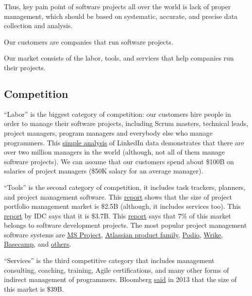 \documentclass[12pt]{article}
\begin{document}
Thus, key pain point of software projects all over the world is lack of proper
management, which should be based on systematic, accurate, and precise data
collection and analysis.

Our customers are companies that run software projects.

Our market consists of the labor, tools, and services that help companies run
their projects.

\subsection{Competition}

``Labor'' is the biggest category of competition: our customers hire people  in
order to manage their software projects, including Scrum masters, technical
leads, project managers, program managers and everybody else who manage
programmers. This \href{https://www.binfire.com/blog/2016/06/how-many-project-managers-in-the-world/}{simple analysis}
of LinkedIn data demonstrates that there are
over two million managers in the world (although, not all of them manage
software projects). We can assume that our customers spend about \$100B on
salaries of project managers (\$50K salary for an average manager).

``Tools'' is the second category of competition, it includes task trackers,
planners, and project management software. This
\href{http://www.marketsandmarkets.com/Market-Reports/project-portfolio-management-software-market-225932595.html}{report}
shows that the size of
project portfolio management market is \$2.5B (although, it includes services
too). This \href{http://www.idc.com/getdoc.jsp?containerId=256779}{report}
by IDC says that it is \$3.7B. This
\href{https://www.capterra.com/project-management-software/user-research/}{report} says that 7\% of this
market belongs to software development projects. The most popular project
management software systems are
\href{https://products.office.com/en-us/project/project-and-portfolio-management-software}{MS Project},
\href{https://www.atlassian.com/software}{Atlassian product family},
\href{https://podio.com/site/en}{Podio},
\href{https://www.wrike.com/}{Wrike},
\href{https://basecamp.com/}{Basecamp}, and
\href{https://www.capterra.com/project-management-software/#infographic}{others}.

``Services'' is the third competitive category that includes management
consulting, coaching, training, Agile certifications, and many other forms of
indirect management of programmers. Bloomberg
\href{http://www.bloomberg.com/news/articles/2013-06-13/where-the-growth-is-in-management-consulting}{said}
in 2013 that the size of this
market is \$39B.
\end{document}
